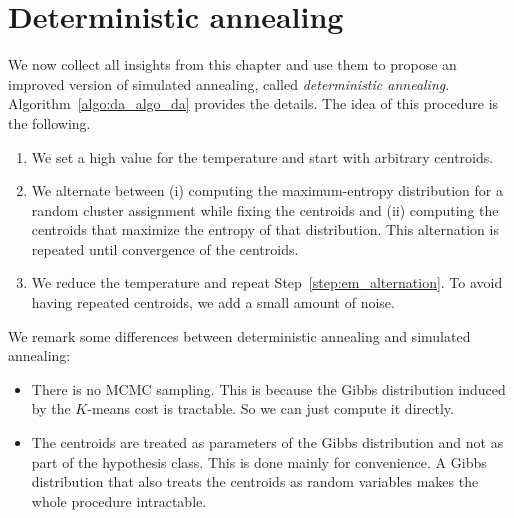 \section{Deterministic annealing}
\label{sec:algo_da}

We now collect all insights from this chapter and use them to propose
an improved version of simulated annealing, called \emph{deterministic annealing}.
Algorithm~\ref{algo:da_algo_da} provides the details. The idea of this procedure is the
following.

\begin{enumerate}
\item We set a high value for the temperature and start with arbitrary
centroids.
\item \label{step:em_alternation} We alternate between (i) computing the maximum-entropy distribution
for a random cluster assignment while fixing the centroids
and (ii) computing the centroids that maximize the entropy of that
distribution. This alternation is repeated until convergence of the
centroids.
\item We reduce the temperature and repeat Step~\ref{step:em_alternation}. To avoid having repeated
centroids, we add a small amount of noise.
\end{enumerate}

We remark some differences between deterministic annealing and simulated
annealing:

\begin{itemize}
\item There is no MCMC sampling. This is because the Gibbs distribution
induced by the $K$-means cost is tractable. So we can just compute it
directly.
\item The centroids are treated as parameters of the Gibbs distribution
and not as part of the hypothesis class. This is done mainly for
convenience. A Gibbs distribution that also treats the centroids as
random variables makes the whole procedure intractable.
\end{itemize}

